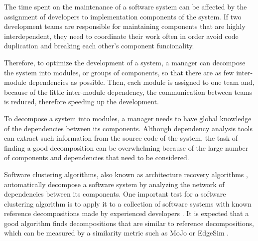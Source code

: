 %

%
The time spent on the maintenance of a software system can be affected by the
assignment of developers to implementation components of the system.
If two development teams are responsible for maintaining components that are
highly interdependent, they need to coordinate their work often in order avoid
code duplication and breaking each other's component funcionality.

%

Therefore, to optimize the development of a system, a manager can decompose the
system into modules, or groups of components, so that there are as few
inter-module dependencies as possible. %
Then, each module is assigned to one team and, because of the little inter-module
dependency, the communication between teams is reduced, therefore speeding up
the development.

To decompose a system into modules, a manager needs to have global knowledge of
the dependencies between its components. Although dependency analysis tools can
extract such information from the source code of the system, the task of finding
a good decomposition can be overwhelming because of the large number of
components and dependencies that need to be considered.

Software clustering algorithms, also known as architecture recovery algorithms
\cite{Mancoridis1998,Anquetil1999,Tzerpos2000,Andritsos2005},
automatically decompose a software system by analyzing the network of
dependencies between its components. %
One important test for a software clustering algorithm is to apply it to a
collection of software systems with known reference decompositions made by
experienced developers \cite{Anquetil1999}. It is expected that a good algorithm
finds decompositions that are similar to reference decompositions, which can be
measured by a similarity metric such as MoJo \cite{Tzerpos1999} or EdgeSim
\cite{Mitchell2001}.

